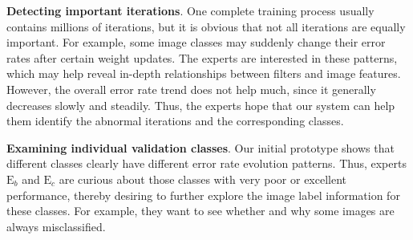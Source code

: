 \documentclass[format=acmsmall, review=false, screen=true]{acmart}
\newcommand{\eb}{{$\mathrm{E}_b$}\xspace}
\newcommand{\ec}{{$\mathrm{E}_c$}\xspace}
\begin{document}
	\item \textbf{Detecting important iterations}.
	One complete training process usually contains millions of iterations, but it is obvious that not all iterations are equally important.	
	For example, some image classes may suddenly change their error rates after certain weight updates.
	The experts are interested in these patterns, which may help reveal in-depth relationships between filters and image features.
	However, the overall error rate trend does not help much, since it generally decreases slowly and steadily.
	Thus, the experts hope that our system can help them identify the abnormal iterations and the corresponding classes.
	
	
	\item \textbf{Examining individual validation classes}.
	Our initial prototype shows that different classes clearly have different error rate evolution patterns. 
	Thus, experts \eb and \ec are curious about those classes with very poor or excellent performance, thereby desiring to further explore the image label information for these classes. 
	For example, they want to see whether and why some images are always misclassified. 
	
\end{document}
